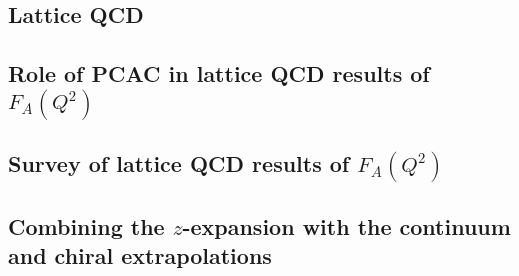 \subsection{Lattice QCD\label{sec:lqcd_intro}}


\subsection{Role of PCAC in lattice QCD results of $F_A(Q^2)$\label{sec:lqcd_pcac}}


\subsection{Survey of lattice QCD results of $F_A(Q^2)$\label{sec:lqcd_results}}


\subsection{Combining the $z$-expansion with the continuum and chiral extrapolations\label{sec:z_continuum}}

